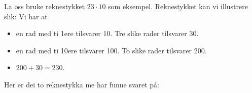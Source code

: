 



	
	La oss bruke reknestykket $ {23\cdot 10} $ som eksempel. Reknestykket kan vi illustrere slik:
	Vi har at	
	\begin{itemize}
		\item en rad med ti 1ere tilsvarer 10. Tre slike rader tilsvarer 30.	
		\item en rad med ti 10ere tilsvarer 100. To slike rader tilsvarer 200.
		\item $ 200+30=230 $. 
	\end{itemize}
	Her er dei to reknestykka me har funne svaret på:




